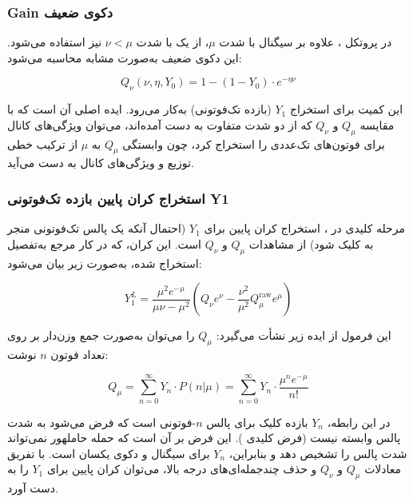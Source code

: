 \subsubsection{Gain دکوی ضعیف}

در پروتکل ، علاوه بر سیگنال با شدت $\mu$، از یک  با شدت $\nu < \mu$ نیز استفاده می‌شود.  این دکوی ضعیف به‌صورت مشابه محاسبه می‌شود:

\begin{equation}
	Q_\nu(\nu, \eta, Y_0) = 1 - (1 - Y_0) \cdot e^{-\eta \nu}
\end{equation}

این کمیت برای استخراج $Y_1$ (بازده تک‌فوتونی) به‌کار می‌رود. ایده اصلی آن است که با مقایسه $Q_\mu$ و $Q_\nu$ که از دو شدت متفاوت به دست آمده‌اند، می‌توان ویژگی‌های کانال برای فوتون‌های تک‌عددی را استخراج کرد، چون وابستگی $Q_\mu$ به $\mu$ از ترکیب خطی توزیع  و ویژگی‌های کانال به دست می‌آید.

\subsubsection{استخراج کران پایین بازده تک‌فوتونی Y1}

مرحله کلیدی در ، استخراج کران پایین برای $Y_1$ (احتمال آنکه یک پالس تک‌فوتونی منجر به کلیک شود) از مشاهدات $Q_\mu$ و $Q_\nu$ است. این کران، که در کار مرجع  به‌تفصیل استخراج شده، به‌صورت زیر بیان می‌شود:

\begin{equation}
	Y_1^{L} = \frac{\mu^2 e^{-\mu}}{\mu \nu - \mu^2} \left( Q_\nu e^{\nu} - \frac{\nu^2}{\mu^2} Q_\mu^{\text{raw}} e^{\mu} \right)
\end{equation}

این فرمول از ایده زیر نشأت می‌گیرد: $Q_\mu$ را می‌توان به‌صورت جمع وزن‌دار بر روی تعداد فوتون $n$ نوشت:

\begin{equation}
	Q_\mu = \sum_{n=0}^{\infty} Y_n \cdot P(n | \mu) = \sum_{n=0}^{\infty} Y_n \cdot \frac{\mu^n e^{-\mu}}{n!}
\end{equation}

در این رابطه، $Y_n$ بازده کلیک برای پالس $n$-فوتونی است که فرض می‌شود به شدت پالس وابسته نیست (فرض کلیدی ). این فرض بر آن است که حمله حاملهور نمی‌تواند شدت پالس را تشخیص دهد و بنابراین، $Y_n$ برای سیگنال و دکوی یکسان است. با تفریق معادلات $Q_\mu$ و $Q_\nu$ و حذف چندجمله‌ای‌های درجه بالا، می‌توان کران پایین برای $Y_1$ را به دست آورد.

